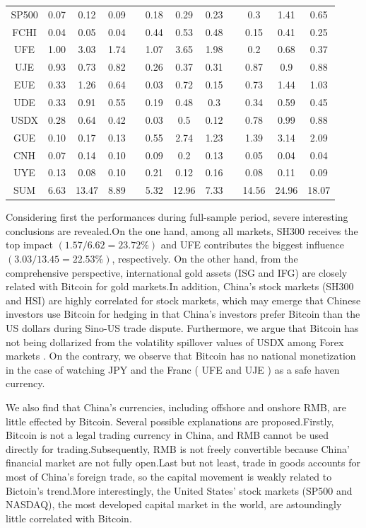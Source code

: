 \documentclass[review]{elsarticle}
\begin{document}
\begin{table}[]
{\begin{tabular}{cccccccccccc}
			SP500 & 0.07 & 0.12 & 0.09 &  & 0.18 & 0.29 & 0.23 &  & 0.3 & 1.41 & 0.65 \\
			FCHI & 0.04 & 0.05 & 0.04 &  & 0.44 & 0.53 & 0.48 &  & 0.15 & 0.41 & 0.25 \\
			UFE & 1.00 & 3.03 & 1.74 &  & 1.07 & 3.65 & 1.98 &  & 0.2 & 0.68 & 0.37 \\
			UJE & 0.93 & 0.73 & 0.82 &  & 0.26 & 0.37 & 0.31 &  & 0.87 & 0.9 & 0.88 \\
			EUE & 0.33 & 1.26 & 0.64 &  & 0.03 & 0.72 & 0.15 &  & 0.73 & 1.44 & 1.03 \\
			UDE & 0.33 & 0.91 & 0.55 &  & 0.19 & 0.48 & 0.3 &  & 0.34 & 0.59 & 0.45 \\
			USDX & 0.28 & 0.64 & 0.42 &  & 0.03 & 0.5 & 0.12 &  & 0.78 & 0.99 & 0.88 \\
			GUE & 0.10 & 0.17 & 0.13 &  & 0.55 & 2.74 & 1.23 &  & 1.39 & 3.14 & 2.09 \\
			CNH & 0.07 & 0.14 & 0.10 &  & 0.09 & 0.2 & 0.13 &  & 0.05 & 0.04 & 0.04 \\
			UYE & 0.13 & 0.08 & 0.10 &  & 0.21 & 0.12 & 0.16 &  & 0.08 & 0.11 & 0.09 \\
			SUM & 6.63 & 13.47 & 8.89 &  & 5.32 & 12.96 & 7.33 &  & 14.56 & 24.96 & 18.07 \\
			\hline
		\end{tabular}
	}
\end{table}

Considering first the performances during full-sample period, severe interesting conclusions are revealed.On the one hand, among all markets, SH300 receives the top impact $( 1.57 / 6.62 = 23.72\%)$ and UFE contributes the biggest influence $( 3.03 / 13.45 = 22.53\%)$, respectively. On the other hand, from the comprehensive perspective, international gold assets (ISG and IFG) are closely related with Bitcoin for gold markets.In addition, China's stock markets (SH300 and HSI) are highly correlated for stock markets, which may emerge that Chinese investors use Bitcoin for hedging in that China's investors prefer Bitcoin than the US dollars during Sino-US trade dispute. Furthermore, we argue that Bitcoin has not being dollarized from the volatility spillover values of USDX among Forex markets \cite{DongGuo2019Dollarization}. On the contrary, we observe that Bitcoin has no national monetization in the case of watching JPY and the Franc ( UFE and UJE ) as a safe haven currency. 


We also find that China's currencies, including offshore and onshore RMB, are little effected by Bitcoin. Several possible explanations are proposed.Firstly, Bitcoin is not a legal trading currency in China, and RMB cannot be used directly for trading.Subsequently, RMB is not freely convertible because China' financial market are not fully open.Last but not least, trade in goods accounts for most of China's foreign trade, so the capital movement is weakly related to Bictoin's trend.More interestingly, the United States' stock markets (SP500 and NASDAQ), the most developed capital market in the world, are astoundingly little correlated with Bitcoin.
\end{document}
